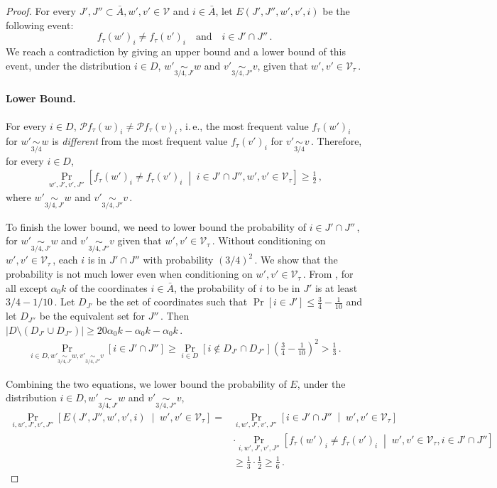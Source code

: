\documentclass[11pt]{article}
\numberwithin{equation}{section}
\theoremstyle{definition}
\theoremstyle{plain}
\newcommand{\ie}{i.\,e.}
\newcommand{\Prob}[2][]{\Pr_{{#1}}\left[#2\right]} %
\newcommand{\Paren}[1]{\left(#1\right)} %
\newcommand{\abs}[1]{\lvert#1\rvert} %
\newcommand{\given}{\;\middle\vert\;} %
\newcommand\f{f} %
\newcommand\bh{\mathcal{P}\f_\tau} %
\newcommand\cons{\mathcal{V}} %
\newcommand\cor[1]{\underset{\scriptscriptstyle#1}{\sim}} %
\newcommand\rest[1]{{\bar{#1}}}  %
\begin{document}
\begin{proof}
	For every $J',J''\subset\bar{A},w',v'\in \cons$ and $i\in\bar{A}$, let $E(J',J'',w',v',i)$ be the following event:
	\[ \f_\tau(w')_i\neq \f_\tau(v')_i \quad\textrm{and} \quad i\in J'\cap J''\,.\]
	We reach a contradiction by giving an upper bound and a lower bound of this event, under the distribution $i\in D$,  $w'\cor{3/4,J'}w$ and $v'\cor{3/4,J''} v$, given that $w',v'\in \cons_\tau$\,.
	
	\paragraph*{Lower Bound.}
	For every $i\in D$, $\bh(w)_i\neq\bh(v)_i$\,, \ie, the most frequent value $\f_\tau(w')_i$ for $w'\cor{3/4}w$ is \emph{different} from the most frequent value $\f_\tau(v')_i$ for $v'\cor{3/4} v$\,.
	Therefore, for every $i\in D$,
	\begin{align}\label{eq:i in D cons}
	\Prob[w',J',v',J'']{\f_\tau(w')_i\neq \f_\tau(v')_i \given i\in J'\cap J'', w',v'\in \cons_\tau} \geq \frac{1}{2}\,,%
	\end{align}
	where $w'\cor{3/4,J'}w$ and $v'\cor{3/4,J''} v$\,.
	
	To finish the lower bound, we need to lower bound the probability of $i\in J'\cap J''$\,,
    for $w'\cor{3/4,J'}w$ and $v'\cor{3/4,J''} v$ given that $w',v'\in \cons_\tau$\,. Without conditioning on $w',v'\in \cons_\tau$\,, each $i$ is in $J'\cap J''$ with probability 
  $\Paren{3/4}^2$\,. %
 We show that the probability is not much lower even when conditioning on $w',v'\in \cons_\tau$\,. From , for all except $\alpha_0 k$ of the coordinates $i\in\rest{A}$, the probability of $i$ to be in $J'$ is at least 
    $3/4-1/10$\,. %
 Let $D_{J'}$ be the set of coordinates such that $\Pr[i\in J']\leq \frac{3}{4}-\frac{1}{10}$ and let $D_{J''}$ be the equivalent set for $J''$\,. Then $\abs{D\setminus (D_{J'}\cup D_{J''})}\geq 20\alpha_0 k - \alpha_0 k - \alpha_0 k$\,.
    \begin{align*}
        \Prob[i\in D,w'\cor{3/4,J'}w,v'\cor{3/4,J''} v]{i\in J'\cap J''}\geq \Prob[i\in D]{i\notin D_{J'}\cap D_{J''}}\Paren{\frac{3}{4}-\frac{1}{10}}^2 > \frac{1}{3}\,. %
    \end{align*}
  
	Combining the two equations, we lower bound the probability of $E$, under the distribution $i\in D, w'\cor{3/4,J'}w$ and $v'\cor{3/4,J''} v$,
	\begin{align*}
	\Prob[i,w',J',v',J'']{E(J',J'',w',v',i)\given w',v'\in \cons_\tau} =& \Prob[i,w',J',v',J'']{i\in J'\cap J''\given w',v'\in \cons_\tau} \\
	&\cdot
	 \Prob[i,w',J',v',J'']{\f_\tau(w')_i\neq \f_\tau(v')_i\given w',v'\in \cons_\tau, i\in J'\cap J''} \nonumber\\
	&\geq \frac{1}{3}\cdot \frac{1}{2} \geq \frac{1}{6}\,. \label{eq:low E} %
	\end{align*}
	

\end{proof}
\end{document}
